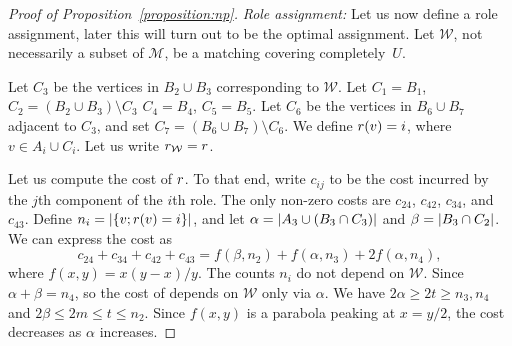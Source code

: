 \begin{proof}[Proof of Proposition~\ref{proposition:np}]
\iffalse
The first part entails vertex sets $A$ and $B$ with $\abs{A} = 3$ and $\abs{B}
= \ell$.  Each vertex $a \in A$ and $b \in B$ is connected with a \emph{fat} edge:
$t$ copies of a path $a$--$x$--$b$, where $x$ is a vertex unique to the path.
Each vertex $a \in A$ is connected to its own clique of size $h$.  Finally, one
vertex, say $b^* \in B$ is connected to an additional vertex, who is also connected
to a biclique $K(s, s)$.

The final graph consists of $t$ copies of the first part.

The second part is very similar to the first.  It entails the vertex sets $A'$
and $B'$ with $\abs{A'} = n$ and $\abs{B'} = h$. Here $A'$ corresponds to the
universe $U$.  Each vertex $a \in A'$ and $b \in B'$ is connected with a
\emph{fat} edge of size $t$.  Finally, let $C'$ be the subset of $B'$ that
corresponds to the sets in $\mathcal{M}$.  Each vertex $c \in C'$ is connected
to its own unique vertex. We will denote these vertices by $O'$.
Each vertex in $O'$ is also connected to its own dedicated bi-clique
$K(s, s)$. 
\fi

\emph{Role assignment:}
Let us now define a role assignment, later this will turn out to be the optimal
assignment. Let $\mathcal{W}$, not necessarily a subset of $\mathcal{M}$, be a
matching covering completely~$U$.

Let $C_3$ be the vertices in $B_2 \cup B_3$ corresponding to $\mathcal{W}$.
Let $C_1 = B_1$, $C_2 = (B_2 \cup B_3) \setminus C_3$ $C_4 = B_4$, $C_5 = B_5$.
Let $C_6$ be the vertices in $B_6 \cup B_7$ adjacent to $C_3$, and set $C_7 = (B_6 \cup B_7) \setminus C_6$.
We define $r(v) = i$, where $v \in A_i \cup C_i$.
Let us write $r_{\mathcal{W}} = r$.

Let us compute the cost of $r$.
To that end, write $c_{ij}$ to be the cost incurred by the $j$th component of the $i$th role.
The only non-zero costs are $c_{24}$, $c_{42}$, $c_{34}$, and $c_{43}$.
Define $n_i = {\left|\left\{v ; r(v) = i\right\}\right|}$,
and let $\alpha = {\left|A_3 \cup (B_3 \cap C_3)\right|}$ and $\beta = {\left|B_3 \cap C_2\right|}$.
We can express the cost as
\[
	c_{24} + c_{34} + c_{42} + c_{43} = f(\beta, n_2) + f(\alpha, n_3) + 2f(\alpha, n_4),
\]
where $f(x, y) = x(y - x)/y$.
The counts $n_i$ do not depend on $\mathcal{W}$.
Since $\alpha + \beta = n_4$, so the cost of depends on $\mathcal{W}$ only via $\alpha$.
We have $2\alpha \geq 2t \geq n_3, n_4$ and $2\beta \leq 2m \leq t \leq n_2$.
Since $f(x, y)$ is a parabola peaking at $x = y / 2$,
the cost decreases as $\alpha$ increases.


\end{proof}
